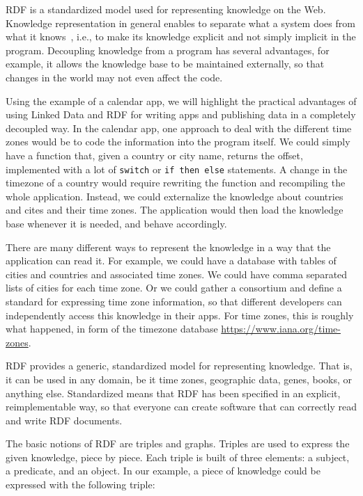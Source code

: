 RDF is a standardized model used for representing knowledge on the Web.
Knowledge representation in general enables to separate what a system does from what it knows~\cite{brachmannKR}, i.e., to make its knowledge explicit and not simply implicit in the program.
Decoupling knowledge from a program has several advantages, for example, it allows the knowledge base to be maintained externally, so that changes in the world may not even affect the code.

Using the example of a calendar app, we will highlight the practical advantages of using Linked Data and RDF for writing apps and publishing data in a completely decoupled way.
In the calendar app, one approach to deal with the different time zones would be to code the information into the program itself. 
We could simply have a function that, given a country or city name, returns the offset, implemented with a lot of \texttt{switch} or \texttt{if then else} statements.
A change in the timezone of a country would require rewriting the function and recompiling the whole application.
Instead, we could externalize the knowledge about countries and cites and their time zones.
The application would then load the knowledge base whenever it is needed, and behave accordingly.

There are many different ways to represent the knowledge in a way that the application can read it.
For example, we could have a database with tables of cities and countries and associated time zones.
We could have comma separated lists of cities for each time zone.
Or we could gather a consortium and define a standard for expressing time zone information, so that different developers can independently access this knowledge in their apps.%
For time zones, this is roughly what happened, in form of the timezone database \url{https://www.iana.org/time-zones}.

RDF provides a generic, standardized model for representing knowledge.
That is, it can be used in any domain, be it time zones, geographic data, genes, books, or anything else.
Standardized means that RDF has been specified in an explicit, reimplementable way, so that everyone can create software that can correctly read and write RDF documents.

The basic notions of RDF are triples and graphs.
Triples are used to express the given knowledge, piece by piece.
Each triple is built of three elements: a subject, a predicate, and an object.
In our example, a piece of knowledge could be expressed with the following triple:

